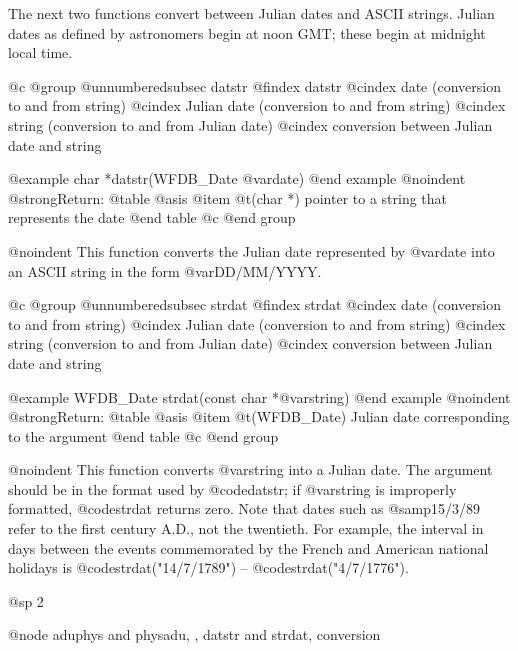 {{{{{{{{The next two functions convert between Julian dates and ASCII strings.
Julian dates as defined by astronomers begin at noon GMT; these begin at
midnight local time.

@c @group
@unnumberedsubsec datstr
@findex datstr
@cindex date (conversion to and from string)
@cindex Julian date (conversion to and from string)
@cindex string (conversion to and from Julian date)
@cindex conversion between Julian date and string

@example
char *datstr(WFDB_Date @var{date})
@end example
@noindent
@strong{Return:}
@table @asis
@item @t{(char *)}
pointer to a string that represents the date
@end table
@c @end group

@noindent
This function converts the Julian date represented by @var{date} into
an ASCII string in the form @var{DD/MM/YYYY}.

@c @group
@unnumberedsubsec strdat
@findex strdat
@cindex date (conversion to and from string)
@cindex Julian date (conversion to and from string)
@cindex string (conversion to and from Julian date)
@cindex conversion between Julian date and string

@example
WFDB_Date strdat(const char *@var{string})
@end example
@noindent
@strong{Return:}
@table @asis
@item @t{(WFDB_Date)}
Julian date corresponding to the argument
@end table
@c @end group

@noindent
This function converts @var{string} into a Julian date.  The argument
should be in the format used by @code{datstr}; if @var{string} is
improperly formatted, @code{strdat} returns zero.  Note that dates such
as @samp{15/3/89} refer to the first century A.D., not the twentieth.
For example, the interval in days between the events commemorated by the
French and American national holidays is @code{strdat("14/7/1789")} --
@code{strdat("4/7/1776")}.

@sp 2

@node aduphys and physadu, , datstr and strdat, conversion

}}}}}}}}
